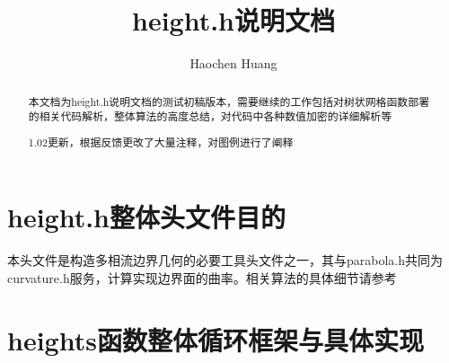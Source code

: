 \documentclass[lang=cn,11pt,a4paper]{elegantpaper}
\title{height.h说明文档}
\author{Haochen Huang}
\institute{西安交通大学MFM课题组}
\date{\zhtoday}
\begin{document}
\maketitle
\begin{abstract}
    本文档为height.h说明文档的测试初稿版本，需要继续的工作包括对树状网格函数部署的相关代码解析，整体算法的高度总结，对代码中各种数值加密的详细解析等\par
    1.02更新，根据反馈更改了大量注释，对图例进行了阐释
\end{abstract}

\tableofcontents

\section{height.h整体头文件目的}
本头文件是构造多相流边界几何的必要工具头文件之一，其与parabola.h共同为curvature.h服务，计算实现边界面的曲率。相关算法的具体细节请参考\cite{popinet2009accurate}

\section{heights函数整体循环框架与具体实现}
\end{document}
